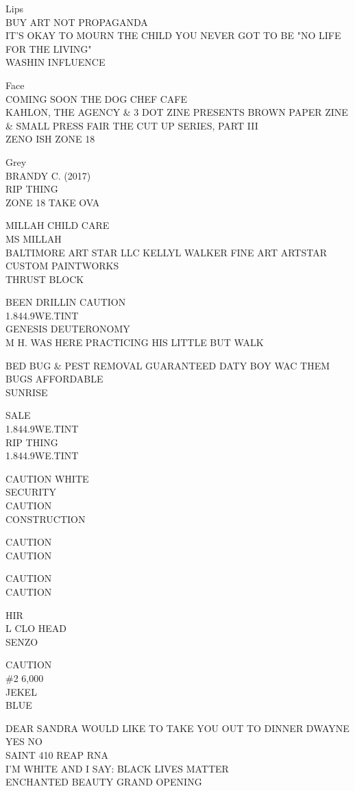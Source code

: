 \documentclass[10pt,letterpaper]{article}
\begin{document}
Lips\\
BUY ART NOT PROPAGANDA\\
IT'S OKAY TO MOURN THE CHILD YOU NEVER GOT TO BE "NO LIFE FOR THE LIVING"\\
WASHIN INFLUENCE

Face\\
COMING SOON THE DOG CHEF CAFE\\
KAHLON, THE AGENCY \& 3 DOT ZINE PRESENTS BROWN PAPER ZINE \& SMALL PRESS FAIR THE CUT UP SERIES, PART III\\
ZENO ISH ZONE 18

Grey\\
BRANDY C. (2017)\\
RIP THING\\
ZONE 18 TAKE OVA

MILLAH CHILD CARE\\
MS MILLAH\\
BALTIMORE ART STAR LLC KELLYL WALKER FINE ART ARTSTAR CUSTOM PAINTWORKS\\
THRUST BLOCK

BEEN DRILLIN CAUTION\\
1.844.9WE.TINT\\
GENESIS DEUTERONOMY\\
M H. WAS HERE PRACTICING HIS LITTLE BUT WALK

BED BUG \& PEST REMOVAL GUARANTEED DATY BOY WAC THEM BUGS AFFORDABLE\\
SUNRISE

SALE\\
1.844.9WE.TINT\\
RIP THING\\
1.844.9WE.TINT

CAUTION WHITE\\
SECURITY\\
CAUTION\\
CONSTRUCTION

CAUTION\\
CAUTION

CAUTION\\
CAUTION

HIR\\
L CLO HEAD\\
SENZO

CAUTION\\
\#2 6,000\\
JEKEL\\
BLUE

DEAR SANDRA WOULD LIKE TO TAKE YOU OUT TO DINNER DWAYNE YES NO\\
SAINT 410 REAP RNA\\
I'M WHITE AND I SAY: BLACK LIVES MATTER\\
ENCHANTED BEAUTY GRAND OPENING
\end{document}

